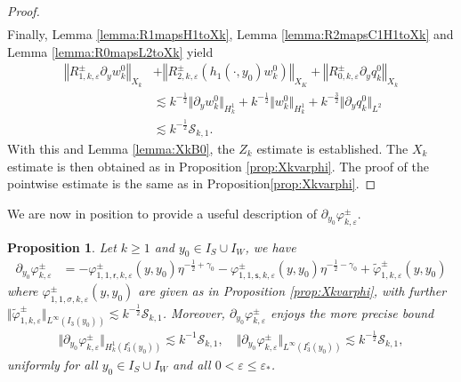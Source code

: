 \documentclass[11pt,reqno]{amsproc}
\newtheorem{proposition}{Proposition}[section]
\theoremstyle{definition}
\numberwithin{equation}{section}
\newcommand{\sr}{{\mathsf{r}}}
\newcommand{\s}{{\mathsf{s}}}
\newcommand{\cS}{{\mathcal S}}
\newcommand{\ep}{\varepsilon}
\begin{document}
\begin{proof}
\begin{align*}
\end{align*}
Finally, Lemma \ref{lemma:R1mapsH1toXk}, Lemma \ref{lemma:R2mapsC1H1toXk} and Lemma \ref{lemma:R0mapsL2toXk} yield
\begin{align*}
\left\Vert R_{1,k,\ep}^\pm \partial_y w_k^0 \right\Vert_{X_k} &+ \left\Vert R_{2,k,\ep}^\pm \left(h_1(\cdot,y_0) w_k^0\right) \right \Vert_{X_K} + \left\Vert R_{0,k,\ep}^\pm \partial_y q_k^0 \right\Vert_{X_k} \\
&\lesssim k^{-\frac12}\Vert \partial_y w_k^0\Vert_{H_k^1} + k^{-\frac12}\Vert w_k^0\Vert_{H_k^1} + k^{-\frac32}\Vert \partial_y q_k^0\Vert_{L^2} \\
&\lesssim k^{-\frac12}\cS_{k,1}.
\end{align*}
With this and Lemma \ref{lemma:XkB0}, the $Z_k$ estimate is established. The $X_k$ estimate is then obtained as in Proposition \ref{prop:Xkvarphi}. The proof of the pointwise estimate is the same as in Proposition\ref{prop:Xkvarphi}.
\end{proof}

We are now in position to provide a useful description of $\partial_{y_0}\varphi_{k,\ep}^\pm$.

\begin{proposition}\label{prop:Xkpynotvarphi}
Let $k\geq 1$ and $y_0\in I_S\cup I_W$, we have
\begin{equation}\label{eq:decomXkpynotvarphi}
\begin{split}
\partial_{y_0}\varphi_{k,\ep}^\pm &= -\varphi_{1,1,\sr,k,\ep}^\pm(y,y_0) \eta^{-\frac12+\gamma_0} -\varphi_{1,1,\s,k,\ep}^\pm(y,y_0) \eta^{-\frac12-\gamma_0} + \widetilde\varphi_{1,k,\ep}^\pm(y,y_0)
\end{split}
\end{equation}
where $\varphi_{1,1,\sigma,k,\ep}^\pm(y,y_0)$ are given as in Proposition \ref{prop:Xkvarphi}, with further $\Vert \widetilde\varphi_{1,k,\ep}^\pm \Vert_{L^\infty(I_3(y_0))} \lesssim  k^{-\frac12}\cS_{k,1}$. Moreover, $\partial_{y_0}\varphi_{k,\ep}^\pm$ enjoys the more precise bound
\begin{align*}
\Vert \partial_{y_0}\varphi_{k,\ep}^\pm \Vert_{H_k^1(I_3^c(y_0))} \lesssim  k^{-1}\cS_{k,1}, \quad \Vert \partial_{y_0}\varphi_{k,\ep}^\pm \Vert_{L^\infty(I_3^c(y_0))} \lesssim k^{-\frac12}\cS_{k,1}, 
\end{align*}
uniformly for all $y_0\in I_S\cup I_{W}$ and all $0 < \ep\leq \ep_*$.
\end{proposition}
\end{document}
